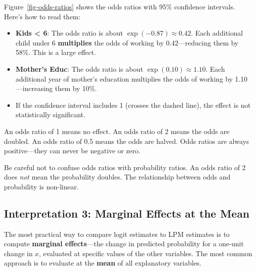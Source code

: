 \documentclass[
  letterpaper,
  DIV=11,
  numbers=noendperiod]{scrreprt}
\providecommand{\tightlist}{%
  \setlength{\itemsep}{0pt}\setlength{\parskip}{0pt}}
\begin{document}
Figure~\ref{fig-odds-ratios} shows the odds ratios with 95\% confidence
intervals. Here's how to read them:

\begin{itemize}
\tightlist
\item
  \textbf{Kids \textless{} 6}: The odds ratio is about
  \(\exp(-0.87) \approx 0.42\). Each additional child under 6
  \textbf{multiplies} the odds of working by 0.42---reducing them by
  58\%. This is a large effect.
\item
  \textbf{Mother's Educ}: The odds ratio is about
  \(\exp(0.10) \approx 1.10\). Each additional year of mother's
  education multiplies the odds of working by 1.10---increasing them by
  10\%.
\item
  If the confidence interval includes 1 (crosses the dashed line), the
  effect is not statistically significant.
\end{itemize}

\begin{tcolorbox}[enhanced jigsaw, arc=.35mm, bottomrule=.15mm, bottomtitle=1mm, breakable, colback=white, colbacktitle=quarto-callout-note-color!10!white, colframe=quarto-callout-note-color-frame, coltitle=black, left=2mm, leftrule=.75mm, opacityback=0, opacitybacktitle=0.6, rightrule=.15mm, title=\textcolor{quarto-callout-note-color}{\faInfo}\hspace{0.5em}{Understanding Odds Ratios}, titlerule=0mm, toprule=.15mm, toptitle=1mm]

An odds ratio of 1 means no effect. An odds ratio of 2 means the odds
are doubled. An odds ratio of 0.5 means the odds are halved. Odds ratios
are always positive---they can never be negative or zero.

Be careful not to confuse odds ratios with probability ratios. An odds
ratio of 2 does \emph{not} mean the probability doubles. The
relationship between odds and probability is non-linear.

\end{tcolorbox}

\subsection{Interpretation 3: Marginal Effects at the
Mean}\label{interpretation-3-marginal-effects-at-the-mean}

The most practical way to compare logit estimates to LPM estimates is to
compute \textbf{marginal effects}---the change in predicted probability
for a one-unit change in \(x\), evaluated at specific values of the
other variables. The most common approach is to evaluate at the
\textbf{mean} of all explanatory variables.
\end{document}
